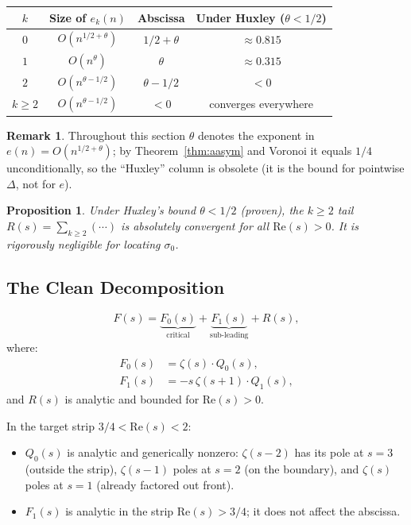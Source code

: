 \documentclass[12pt]{article}
\newtheorem{proposition}[theorem]{Proposition}
\theoremstyle{definition}
\newtheorem{remark}[theorem]{Remark}
\begin{document}
\begin{center}
\begin{tabular}{cccc}
\hline
$k$ & Size of $e_k(n)$ & Abscissa & Under Huxley ($\theta < 1/2$)\\
\hline
$0$ & $O(n^{1/2+\theta})$ & $1/2+\theta$ & $\approx 0.815$\\
$1$ & $O(n^\theta)$ & $\theta$ & $\approx 0.315$\\
$2$ & $O(n^{\theta-1/2})$ & $\theta - 1/2$ & $< 0$\\
$k\ge 2$ & $O(n^{\theta-1/2})$ & $< 0$ & converges everywhere\\
\hline
\end{tabular}
\end{center}

\begin{remark}
Throughout this section $\theta$ denotes the exponent in $e(n)=O(n^{1/2+\theta})$; by
Theorem~\ref{thm:aasym} and Voronoi it equals $1/4$ unconditionally, so the ``Huxley''
column is obsolete (it is the bound for pointwise $\Delta$, not for $e$).
\end{remark}

\begin{proposition}
Under Huxley's bound $\theta < 1/2$ (proven), the $k \ge 2$ tail
$R(s) = \sum_{k\ge 2}(\cdots)$ is absolutely convergent for all
$\mathrm{Re}(s) > 0$.  It is rigorously negligible for locating $\sigma_0$.
\end{proposition}

\subsection{The Clean Decomposition}

\begin{equation}
    F(s) = \underbrace{F_0(s)}_{\text{critical}} + \underbrace{F_1(s)}_{\text{sub-leading}} + R(s),
    \label{eq:decomp}
\end{equation}
where:
\begin{align}
    F_0(s) &= \zeta(s)\cdot Q_0(s), \label{eq:F0}\\
    F_1(s) &= -s\,\zeta(s+1)\cdot Q_1(s), \label{eq:F1}
\end{align}
and $R(s)$ is analytic and bounded for $\mathrm{Re}(s) > 0$.

In the target strip $3/4 < \mathrm{Re}(s) < 2$:
\begin{itemize}
    \item $Q_0(s)$ is analytic and generically nonzero: $\zeta(s-2)$ has its
          pole at $s=3$ (outside the strip), $\zeta(s-1)$ poles at $s=2$
          (on the boundary), and $\zeta(s)$ poles at $s=1$ (already factored
          out front).
    \item $F_1(s)$ is analytic in the strip $\mathrm{Re}(s) > 3/4$; it does
          not affect the abscissa.
\end{itemize}
\end{document}
